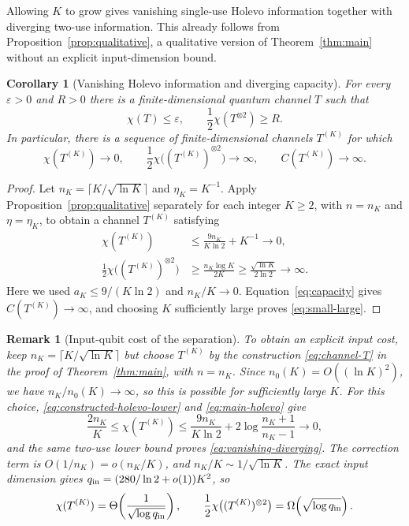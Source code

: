 \documentclass[11pt]{article}
\numberwithin{equation}{section}
\newtheorem{corollary}[theorem]{Corollary}
\theoremstyle{boldremark}\newtheorem{remark}[theorem]{Remark}
\begin{document}
Allowing $K$ to grow gives vanishing single-use Holevo information
together with diverging two-use information. This already follows
from Proposition~\ref{prop:qualitative}, a qualitative version of
Theorem~\ref{thm:main} without an explicit input-dimension bound.

\begin{corollary}[Vanishing Holevo information and diverging capacity]
\label{cor:separation}
For every $\varepsilon>0$ and $R>0$ there is a finite-dimensional quantum
channel $T$ such that
\begin{equation}
 \chi(T)\le\varepsilon,
 \qquad \frac12\chi(T^{\otimes2})\ge R.
 \label{eq:small-large}
\end{equation}
In particular, there is a sequence of finite-dimensional channels
$T^{(K)}$ for which
\begin{equation}
 \chi(T^{(K)})\longrightarrow0,
 \qquad \frac12\chi\bigl((T^{(K)})^{\otimes2}\bigr)\longrightarrow\infty,
 \qquad C(T^{(K)})\longrightarrow\infty.
 \label{eq:vanishing-diverging}
\end{equation}
\end{corollary}

\begin{proof}
Let $n_K=\lceil K/\sqrt{\ln K}\rceil$ and $\eta_K=K^{-1}$.
Apply Proposition~\ref{prop:qualitative} separately for each integer
$K\ge2$, with $n=n_K$ and $\eta=\eta_K$, to obtain a channel
$T^{(K)}$ satisfying
\begin{align*}
 \chi(T^{(K)})
 &\le\frac{9n_K}{K\ln2}+K^{-1}\longrightarrow0,\\
 \frac12\chi\bigl((T^{(K)})^{\otimes2}\bigr)
 &\ge\frac{n_K\log K}{2K}
 \ge\frac{\sqrt{\ln K}}{2\ln2}\longrightarrow\infty.
\end{align*}
Here we used $a_K\le9/(K\ln2)$ and $n_K/K\to0$.
Equation~\eqref{eq:capacity} gives $C(T^{(K)})\to\infty$,
and choosing $K$ sufficiently large proves \eqref{eq:small-large}.
\end{proof}

\begin{remark}[Input-qubit cost of the separation]
\label{rem:separation-cost}
To obtain an explicit input cost, keep
$n_K=\lceil K/\sqrt{\ln K}\rceil$ but choose $T^{(K)}$ by the
construction \eqref{eq:channel-T} in the proof of
Theorem~\ref{thm:main}, with $n=n_K$.
Since $n_0(K)=O((\ln K)^2)$, we have $n_K/n_0(K)\to\infty$, so this is
possible for sufficiently large $K$.
For this choice, \eqref{eq:constructed-holevo-lower} and
\eqref{eq:main-holevo} give
\[
 \frac{2n_K}{K}\le\chi(T^{(K)})\le\frac{9n_K}{K\ln2}
       +2\log\frac{n_K+1}{n_K-1}\longrightarrow0,
\]
and the same two-use lower bound proves
\eqref{eq:vanishing-diverging}.
The correction term is $O(1/n_K)=o(n_K/K)$, and
$n_K/K\sim1/\sqrt{\ln K}$. The exact input dimension gives
$q_{\rm in}=(280/\ln2+o(1))K^2$, so
\[
 \chi(T^{(K)})=\Theta\!\left(\frac1{\sqrt{\log q_{\rm in}}}\right),
 \qquad
 \frac12\chi\bigl((T^{(K)})^{\otimes2}\bigr)
 =\Omega\!\left(\sqrt{\log q_{\rm in}}\right).
\]
\end{remark}
\end{document}
